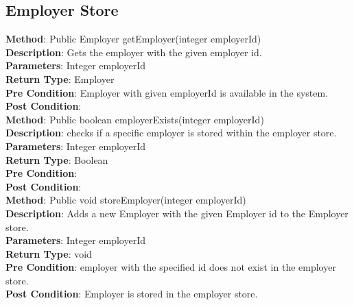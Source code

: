 \documentclass{l3deliverable}
\begin{document}
\subsection{Employer Store}

\textbf{Method}: Public Employer getEmployer(integer employerId)\\
\textbf{Description}: Gets the employer with the given employer id.\\
\textbf{Parameters}:  Integer employerId\\
\textbf{Return Type}: Employer\\
\textbf{Pre Condition}: Employer with given employerId is available in the system.\\
\textbf{Post Condition}:\\


\textbf{Method}: Public boolean employerExists(integer employerId) \\
\textbf{Description}: checks if a specific employer is stored within the employer store.\\
\textbf{Parameters}: Integer employerId\\
\textbf{Return Type}: Boolean\\
\textbf{Pre Condition}:\\
\textbf{Post Condition}:\\

\textbf{Method}: Public void storeEmployer(integer employerId) \\
\textbf{Description}:  Adds a new Employer with the given Employer id to the Employer store.\\
\textbf{Parameters}: Integer employerId\\
\textbf{Return Type}: void\\
\textbf{Pre Condition}: employer with the specified id does not exist in the employer store.\\
\textbf{Post Condition}: Employer is stored in the employer store.\\
\end{document}
